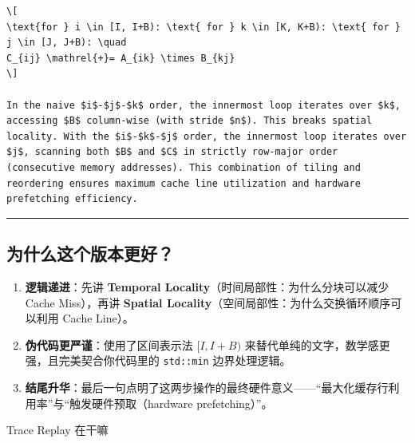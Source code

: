 \documentclass[11pt, a4paper]{article}
\begin{document}
\begin{aibox}
\begin{tcolorbox}[colback=white,colframe=gray!50!white,boxrule=0.5pt,arc=2pt,left=5pt,right=5pt,top=5pt,bottom=5pt]
\begin{verbatim}
\[
\text{for } i \in [I, I+B): \text{ for } k \in [K, K+B): \text{ for } j \in [J, J+B): \quad
C_{ij} \mathrel{+}= A_{ik} \times B_{kj}
\]

In the naive $i$-$j$-$k$ order, the innermost loop iterates over $k$, accessing $B$ column-wise (with stride $n$). This breaks spatial locality. With the $i$-$k$-$j$ order, the innermost loop iterates over $j$, scanning both $B$ and $C$ in strictly row-major order (consecutive memory addresses). This combination of tiling and reordering ensures maximum cache line utilization and hardware prefetching efficiency.
\end{verbatim}
\end{tcolorbox}

\begin{center}\rule{\textwidth}{0.4pt}\end{center}

\subsection*{为什么这个版本更好？}
\begin{enumerate}
    \item \textbf{逻辑递进}：先讲 \textbf{Temporal Locality}（时间局部性：为什么分块可以减少 Cache Miss），再讲 \textbf{Spatial Locality}（空间局部性：为什么交换循环顺序可以利用 Cache Line）。
    \item \textbf{伪代码更严谨}：使用了区间表示法 $[I, I+B)$ 来替代单纯的文字，数学感更强，且完美契合你代码里的 \texttt{std::min} 边界处理逻辑。
    \item \textbf{结尾升华}：最后一句点明了这两步操作的最终硬件意义——“最大化缓存行利用率”与“触发硬件预取（hardware prefetching）”。
\end{enumerate}

\end{aibox}

\vspace{1.5em}

\begin{userbox}
Trace Replay 在干嘛
\end{userbox}
\end{document}
